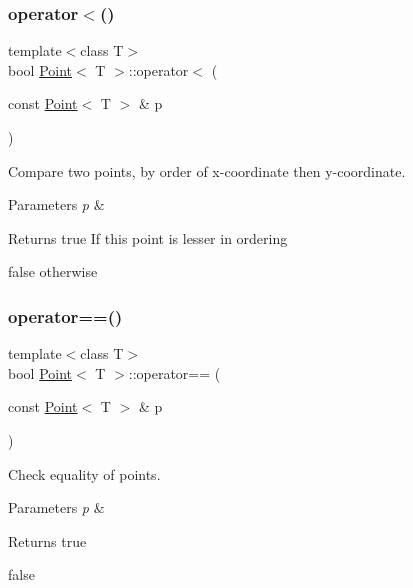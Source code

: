 \subsubsection{\texorpdfstring{operator$<$()}{operator<()}}
{\footnotesize\ttfamily template$<$class T$>$ \\
bool \mbox{\hyperlink{classPoint}{Point}}$<$ T $>$\+::operator$<$ (\begin{DoxyParamCaption}\item[{const \mbox{\hyperlink{classPoint}{Point}}$<$ T $>$ \&}]{p }\end{DoxyParamCaption})\hspace{0.3cm}{\ttfamily [inline]}}



Compare two points, by order of x-\/coordinate then y-\/coordinate. 


\begin{DoxyParams}{Parameters}
{\em p} & \\
\hline
\end{DoxyParams}
\begin{DoxyReturn}{Returns}
true If \textquotesingle{}this\textquotesingle{} point is lesser in ordering 

false otherwise 
\end{DoxyReturn}
\mbox{\label{classPoint_a5241a7c8bfe2a0494b789cad25b52ada}} 
\subsubsection{\texorpdfstring{operator==()}{operator==()}}
{\footnotesize\ttfamily template$<$class T$>$ \\
bool \mbox{\hyperlink{classPoint}{Point}}$<$ T $>$\+::operator== (\begin{DoxyParamCaption}\item[{const \mbox{\hyperlink{classPoint}{Point}}$<$ T $>$ \&}]{p }\end{DoxyParamCaption})\hspace{0.3cm}{\ttfamily [inline]}}



Check equality of points. 


\begin{DoxyParams}{Parameters}
{\em p} & \\
\hline
\end{DoxyParams}
\begin{DoxyReturn}{Returns}
true 

false 
\end{DoxyReturn}
\mbox{\label{classPoint_a825f7be514210803676ed97b988ad7a0}} 
